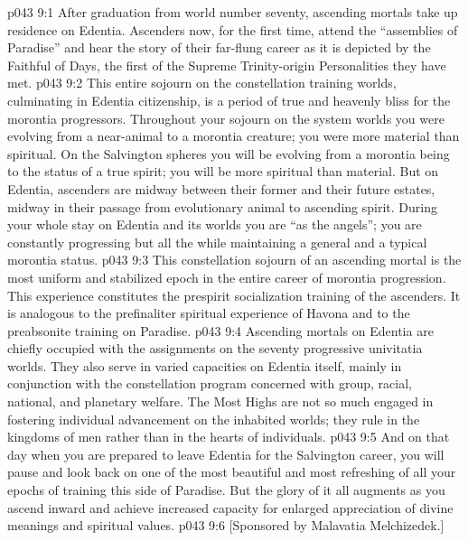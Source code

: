 \vs p043 9:1 After graduation from world number seventy, ascending mortals take up residence on Edentia. Ascenders now, for the first time, attend the “assemblies of Paradise” and hear the story of their far\hyp{}flung career as it is depicted by the Faithful of Days, the first of the Supreme Trinity\hyp{}origin Personalities they have met.
\pc \vs p043 9:2 This entire sojourn on the constellation training worlds, culminating in Edentia citizenship, is a period of true and heavenly bliss for the morontia progressors. Throughout your sojourn on the system worlds you were evolving from a near\hyp{}animal to a morontia creature; you were more material than spiritual. On the Salvington spheres you will be evolving from a morontia being to the status of a true spirit; you will be more spiritual than material. But on Edentia, ascenders are midway between their former and their future estates, midway in their passage from evolutionary animal to ascending spirit. During your whole stay on Edentia and its worlds you are “as the angels”; you are constantly progressing but all the while maintaining a general and a typical morontia status.
\vs p043 9:3 This constellation sojourn of an ascending mortal is the most uniform and stabilized epoch in the entire career of morontia progression. This experience constitutes the prespirit socialization training of the ascenders. It is analogous to the prefinaliter spiritual experience of Havona and to the preabsonite training on Paradise.
\pc \vs p043 9:4 Ascending mortals on Edentia are chiefly occupied with the assignments on the seventy progressive univitatia worlds. They also serve in varied capacities on Edentia itself, mainly in conjunction with the constellation program concerned with group, racial, national, and planetary welfare. The Most Highs are not so much engaged in fostering individual advancement on the inhabited worlds; they rule in the kingdoms of men rather than in the hearts of individuals.
\vs p043 9:5 And on that day when you are prepared to leave Edentia for the Salvington career, you will pause and look back on one of the most beautiful and most refreshing of all your epochs of training this side of Paradise. But the glory of it all augments as you ascend inward and achieve increased capacity for enlarged appreciation of divine meanings and spiritual values.
\vsetoff
\vs p043 9:6 [Sponsored by Malavatia Melchizedek.]
